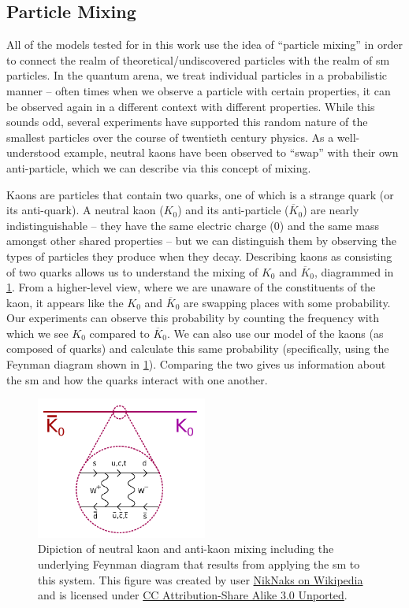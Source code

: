 \subsection{Particle Mixing}
All of the models tested for in this work use the idea of ``particle mixing'' in order to connect
the realm of theoretical/undiscovered particles with the realm of \ac{sm} particles. In the quantum
arena, we treat individual particles in a probabilistic manner -- often times when we observe a
particle with certain properties, it can be observed again in a different context with different
properties. While this sounds odd, several experiments have supported this random nature of the
smallest particles over the course of twentieth century physics. As a well-understood example,
neutral kaons have been observed to ``swap'' with their own anti-particle, which we can describe
via this concept of mixing.

Kaons are particles that contain two quarks, one of which is a strange quark (or its anti-quark). A
neutral kaon (\(K_0\)) and its anti-particle (\(\overline{K}_0\)) are nearly indistinguishable --
they have the same electric charge ($0$) and the same mass amongst other shared properties -- but
we can distinguish them by observing the types of particles they produce when they decay.
Describing kaons as consisting of two quarks allows us to understand the mixing of \(K_0\) and
\(\overline{K}_0\), diagrammed in \cref{fig:kaon-box-diagram}. From a higher-level view, where we
are unaware of the constituents of the kaon, it appears like the \(K_0\) and \(\overline{K}_0\) are
swapping places with some probability. Our experiments can observe this probability by counting the
frequency with which we see \(K_0\) compared to \(\overline{K}_0\).
We can also use our model of the kaons (as composed of quarks) and calculate this
same probability (specifically, using the Feynman diagram shown in \cref{fig:kaon-box-diagram}).
Comparing the two gives us information about the \ac{sm} and how the quarks interact with one
another.

\begin{figure}
  \centering
  \includegraphics[width=0.5\textwidth]{figures/intro/Kaon-box-diagram-with-bar.pdf}
  \caption{
    Dipiction of neutral kaon and anti-kaon mixing including the underlying
    Feynman diagram that results from applying the \ac{sm} to this system.
    This figure was created by user
    \href{https://commons.wikimedia.org/wiki/File:Kaon-box-diagram-with-bar.svg}{NikNaks on Wikipedia}
    and is licensed under
    \href{https://creativecommons.org/licenses/by-sa/3.0/deed.en}{CC Attribution-Share Alike 3.0 Unported}.
  }
  \label{fig:kaon-box-diagram}
\end{figure}


